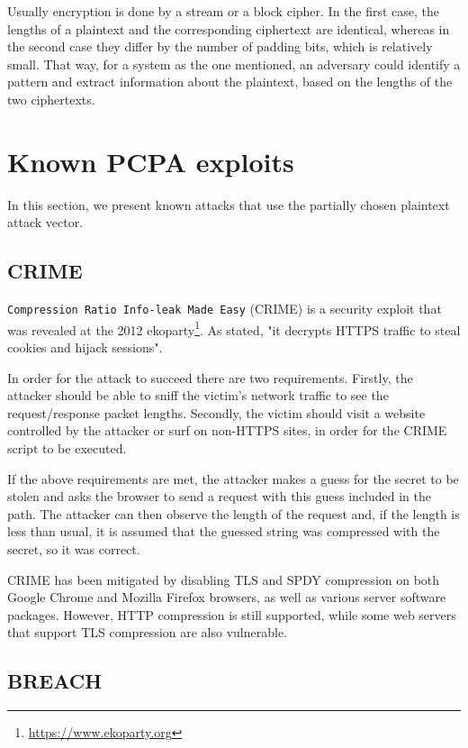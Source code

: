 Usually encryption is done by a stream or a block cipher. In the first case, the
lengths of a plaintext and the corresponding ciphertext are identical, whereas
in the second case they differ by the number of padding bits, which is
relatively small. That way, for a system as the one mentioned, an adversary
could identify a pattern and extract information about the plaintext, based on
the lengths of the two ciphertexts.

\section{Known PCPA exploits}\label{sec:known_pcpa}

In this section, we present known attacks that use the partially chosen
plaintext attack vector.

\subsection{CRIME}

\texttt{Compression Ratio Info-leak Made Easy} (CRIME) \cite{crime} is a
security exploit that was revealed at the 2012
ekoparty\footnote{\url{https://www.ekoparty.org}}. As stated, "it decrypts
HTTPS traffic to steal cookies and hijack sessions".

In order for the attack to succeed there are two requirements. Firstly, the
attacker should be able to sniff the victim's network traffic to see the
request/response packet lengths. Secondly, the victim should visit a website
controlled by the attacker or surf on non-HTTPS sites, in order for the CRIME
script to be executed.

If the above requirements are met, the attacker makes a guess for the secret to
be stolen and asks the browser to send a request with this guess included in the
path. The attacker can then observe the length of the request and, if the
length is less than usual, it is assumed that the guessed string was compressed
with the secret, so it was correct.

CRIME has been mitigated by disabling TLS and SPDY compression on both Google
Chrome and Mozilla Firefox browsers, as well as various server software
packages. However, HTTP compression is still supported, while some web servers
that support TLS compression are also vulnerable.

\subsection{BREACH}

